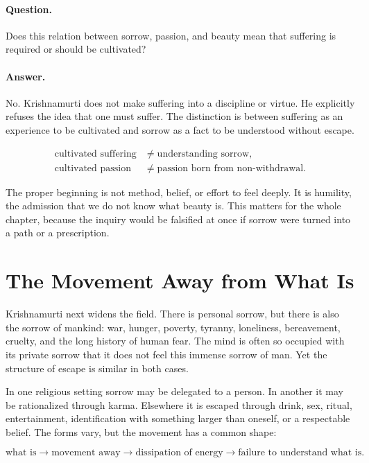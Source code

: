 \paragraph{Question.}
Does this relation between sorrow, passion, and beauty mean that suffering is required or should be cultivated?

\paragraph{Answer.}
No. Krishnamurti does not make suffering into a discipline or virtue. He explicitly refuses the idea that one must suffer. The distinction is between suffering as an experience to be cultivated and sorrow as a fact to be understood without escape.

\begin{align}
\text{cultivated suffering} &\neq \text{understanding sorrow},\\
\text{cultivated passion} &\neq \text{passion born from non-withdrawal}.
\end{align}

The proper beginning is not method, belief, or effort to feel deeply. It is humility, the admission that we do not know what beauty is. This matters for the whole chapter, because the inquiry would be falsified at once if sorrow were turned into a path or a prescription.

\section{The Movement Away from What Is}

Krishnamurti next widens the field. There is personal sorrow, but there is also the sorrow of mankind: war, hunger, poverty, tyranny, loneliness, bereavement, cruelty, and the long history of human fear. The mind is often so occupied with its private sorrow that it does not feel this immense sorrow of man. Yet the structure of escape is similar in both cases.

In one religious setting sorrow may be delegated to a person. In another it may be rationalized through karma. Elsewhere it is escaped through drink, sex, ritual, entertainment, identification with something larger than oneself, or a respectable belief. The forms vary, but the movement has a common shape:

\begin{equation}
\text{what is}
\longrightarrow
\text{movement away}
\longrightarrow
\text{dissipation of energy}
\longrightarrow
\text{failure to understand what is}.
\end{equation}

